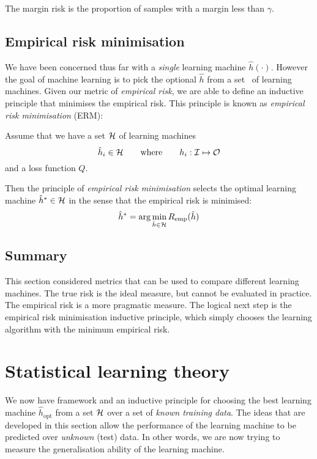 The margin risk is the proportion of samples with a margin less than
$\gamma$.


\subsection{Empirical risk minimisation}
\label{sec:srm}
\label{acr:erm}

We have been concerned thus far with a \emph{single} learning
machine $\hat{h}(\cdot)$.  However the goal of machine learning is to
pick the optional $\hat{h}$  from a set \calH\ of learning machines.
Given our metric of \emph{empirical risk}, we are able to define an
inductive principle that minimises the empirical risk.  This principle
is known as \emph{empirical risk minimisation} (ERM):

Assume that we have a set $\mathcal{H}$ of learning machines
%
\begin{equation}
\hat{h}_i \in \mathcal{H} \qquad \mbox{where} \qquad h_i : \mathcal{I} \mapsto
\mathcal{O}
\end{equation}
%
and a loss function $Q$.

Then the principle of \emph{empirical risk minimisation} selects the
optimal learning machine $\hat{h}^{\ast} \in \mathcal{H}$ in the sense that
the empirical risk is minimised:
%
\begin{equation}
\hat{h}^{\ast} = \arg \min_{\hat{h} \in \mathcal{H}} R_{\mathrm{emp}}(\hat{h})
\label{eqn:erm}
\end{equation}

\subsection{Summary}

This section considered metrics that can be used to compare different
learning machines.  The true risk is the ideal measure, but cannot be
evaluated in practice.  The empirical risk is a more pragmatic
measure.  The logical next step is the empirical risk minimisation
inductive principle, which simply chooses the learning algorithm with
the minimum empirical risk.





\section{Statistical learning theory}
\label{sec:slt}
\label{acr:slt}

We now have framework and an inductive principle for choosing the
best learning machine $\hat{h}_{\mbox{opt}}$ from a set $\mathcal{H}$ over a
set of \emph{known training data}.  The ideas that are developed in
this section allow the performance of the learning machine to be
predicted over \emph{unknown} (test) data.  In other words, we are now
trying to measure the generalisation ability of the learning machine.

